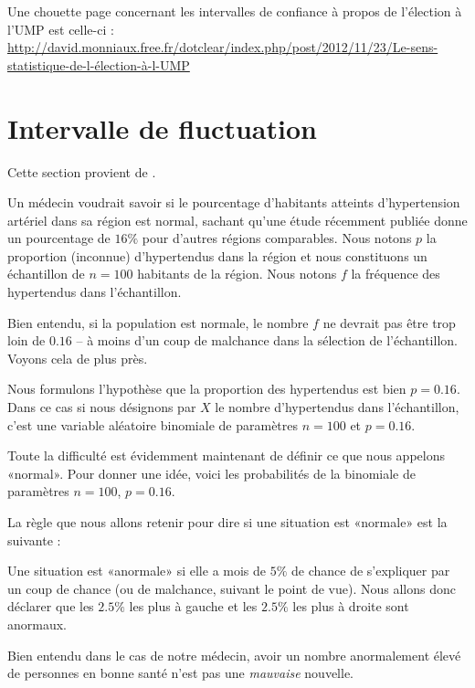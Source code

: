 Une chouette page concernant les intervalles de confiance à propos de l'élection à l'UMP est celle-ci :\\
\url{http://david.monniaux.free.fr/dotclear/index.php/post/2012/11/23/Le-sens-statistique-de-l-élection-à-l-UMP}

\section{Intervalle de fluctuation}

Cette section provient de \cite{JqcbOc}.

Un médecin voudrait savoir si le pourcentage d'habitants atteints d'hypertension artériel dans sa région est normal, sachant qu'une étude récemment publiée donne un pourcentage de \( 16\%\) pour d'autres régions comparables. Nous notons \( p\) la proportion (inconnue) d'hypertendus dans la région et nous constituons un échantillon de \( n=100\) habitants de la région. Nous notons \( f\) la fréquence des hypertendus dans l'échantillon.

Bien entendu, si la population est normale, le nombre \( f\) ne devrait pas être trop loin de \( 0.16\) -- à moins d'un coup de malchance dans la sélection de l'échantillon. Voyons cela de plus près.

Nous formulons l'hypothèse que la proportion des hypertendus est bien \( p=0.16\). Dans ce cas si nous désignons par \( X\) le nombre d'hypertendus dans l'échantillon, c'est une variable aléatoire binomiale de paramètres \( n=100\) et \( p=0.16\).

Toute la difficulté est évidemment maintenant de définir ce que nous appelons «normal». Pour donner une idée, voici les probabilités de la binomiale de paramètres \( n=100\), \( p=0.16\).

\begin{center}

\end{center}

La règle que nous allons retenir pour dire si une situation est «normale» est la suivante :
\begin{Aretenir}
    Une situation est «anormale» si elle a mois de \( 5\%\) de chance de s'expliquer par un coup de chance (ou de malchance, suivant le point de vue). Nous allons donc déclarer que les \( 2.5\%\) les plus à gauche et les \( 2.5\%\) les plus à droite sont anormaux.
\end{Aretenir}
Bien entendu dans le cas de notre médecin, avoir un nombre anormalement élevé de personnes en bonne santé n'est pas une \emph{mauvaise} nouvelle. 

